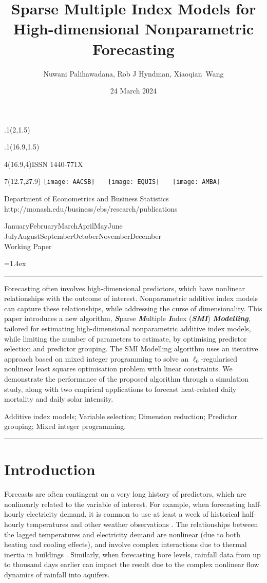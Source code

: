 \documentclass[
  11pt,
  a4paper,
]{article}
\title{Sparse Multiple Index Models for High-dimensional Nonparametric
Forecasting}
\date{24 March 2024}
\author{Nuwani Palihawadana, Rob J Hyndman, Xiaoqian~Wang}
\makeatletter
\def\placefig#1#2#3#4{\begin{textblock}{.1}(#1,#2)\rlap{\texttt{[image: \#4]}}\end{textblock}}
\def\Date{\number\day}
\def\Month{\ifcase\month\or
 January\or February\or March\or April\or May\or June\or
 July\or August\or September\or October\or November\or December\fi}
\def\Year{\number\year}
\def\showjel{{\large\textsf{\textbf{JEL classification:}}~\@jel}}
\def\cover{{\sffamily\setcounter{page}{0}
        \thispagestyle{empty}
        \placefig{2}{1.5}{width=5cm}{monash2}
        \placefig{16.9}{1.5}{width=2.1cm}{MBSportrait}
        \begin{textblock}{4}(16.9,4)ISSN 1440-771X\end{textblock}
        \begin{textblock}{7}(12.7,27.9)\hfill
        \texttt{[image: AACSB]}~~~
        \texttt{[image: EQUIS]}~~~
        \texttt{[image: AMBA]}
        \end{textblock}
        \vspace*{2.5cm}
        \begin{center}\Large
        Department of Econometrics and Business Statistics\\[.5cm]
        \footnotesize http://monash.edu/business/ebs/research/publications
        \end{center}\vspace{2cm}
        \begin{center}
        \fbox{\parbox{14cm}{\begin{onehalfspace}\centering\Huge\vspace*{0.3cm}
                \textsf{\textbf{\expandafter{\@title}}}\vspace{1cm}\par
                \LARGE
                \expandafter{\@author}
                \end{onehalfspace}
        }}
        \end{center}
        \vfill
                \begin{center}\Large
                \Month~\Year\\[1cm]
                Working Paper \@wp
        \end{center}\vspace*{2cm}}}
\def\pageone{{\sffamily\setstretch{1}%
        \thispagestyle{empty}%
        \vbox to \textheight{%
        \raggedright\baselineskip=1.2cm
     {\fontsize{24.88}{30}\sffamily\textbf{\expandafter{\@title}}}
        \vspace{2cm}\par
        \hspace{1cm}\parbox{14cm}{\sffamily\large\@addresses}\vspace{1cm}\vfill
        \hspace{1cm}{\large\Date~\Month~\Year}\\[1cm]
        \hspace{1cm}\showjel\vss}}}
\def\blindtitle{{\sffamily
     \thispagestyle{plain}\raggedright\baselineskip=1.2cm
     {\fontsize{24.88}{30}\sffamily\textbf{\expandafter{\@title}}}\vspace{1cm}\par
        }}
\def\titlepage{{\cover\newpage\pageone\newpage\blindtitle}}
\let\maketitle\titlepage
\newenvironment{keywords}{\par\vspace{0.5cm}\noindent{\sffamily\textbf{Keywords:}}}{\vspace{0.25cm}\par\hrule\vspace{0.5cm}\par}
\renewenvironment{abstract}{\begin{minipage}{\textwidth}\parskip=1.4ex\noindent
\hrule\vspace{0.1cm}\par{\sffamily\textbf{\abstractname}}\newline\setstretch{1.5}}
  {\end{minipage}}
\makeatother
\begin{document}
\maketitle

\begin{abstract}
Forecasting often involves high-dimensional predictors, which have
nonlinear relationships with the outcome of interest. Nonparametric
additive index models can capture these relationships, while addressing
the curse of dimensionality. This paper introduces a new algorithm,
\textbf{\emph{S}}parse \textbf{\emph{M}}ultiple \textbf{\emph{I}}ndex
(\textbf{\emph{SMI}}) \textbf{\emph{Modelling}}, tailored for estimating
high-dimensional nonparametric additive index models, while limiting the
number of parameters to estimate, by optimising predictor selection and
predictor grouping. The SMI Modelling algorithm uses an iterative
approach based on mixed integer programming to solve an
\(\ell_{0}\)-regularised nonlinear least squares optimisation problem
with linear constraints. We demonstrate the performance of the proposed
algorithm through a simulation study, along with two empirical
applications to forecast heat-related daily mortality and daily solar
intensity.
\end{abstract}

\begin{keywords}
  Additive index models; Variable selection; Dimension
reduction; Predictor grouping; 
  Mixed integer programming.
\end{keywords}

\section{Introduction}\label{sec-introduction}

Forecasts are often contingent on a very long history of predictors,
which are nonlinearly related to the variable of interest. For example,
when forecasting half-hourly electricity demand, it is common to use at
least a week of historical half-hourly temperatures and other weather
observations \autocite{HF2010}. The relationships between the lagged
temperatures and electricity demand are nonlinear (due to both heating
and cooling effects), and involve complex interactions due to thermal
inertia in buildings \autocite{FH2012}. Similarly, when forecasting bore
levels, rainfall data from up to thousand days earlier can impact the
result \autocite{Peterson2014,Bakker2019,Rajaee2019} due to the complex
nonlinear flow dynamics of rainfall into aquifers.
\end{document}
